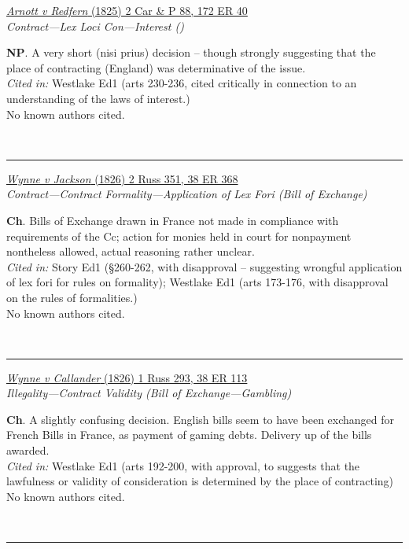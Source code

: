 \documentclass[twoside]{article}
\begin{document}
        \begin{small}
        \begin{center}
        \href{None}{\textit{Arnott v Redfern} (1825) 2 Car \& P 88, 172 ER 40} \label{35} \\ 
\textit{Contract---Lex Loci Con---Interest ()}\\
        \end{center}
        \textbf{NP}. A very short (nisi prius) decision – though strongly suggesting that the place of contracting (England) was determinative of the issue.\\\textit{Cited in: }Westlake Ed1 (arts 230-236, cited critically in connection to an understanding of the laws of interest.)\\No known authors cited.
        \end{small}\\
        \rule{\textwidth}{0.5pt}
        

        \begin{small}
        \begin{center}
        \href{https://heinonline.org/HOL/P?h=hein.engrep/engrc0038&i=376}{\textit{Wynne v Jackson} (1826) 2 Russ 351, 38 ER 368} \label{57} \\ 
\textit{Contract---Contract Formality---Application of Lex Fori (Bill of Exchange)}\\
        \end{center}
        \textbf{Ch}. Bills of Exchange drawn in France not made in compliance with requirements of the Cc; action for monies held in court for nonpayment nontheless allowed, actual reasoning rather unclear.\\\textit{Cited in: }Story Ed1 (§260-262, with disapproval – suggesting wrongful application of lex fori for rules on formality); Westlake Ed1 (arts 173-176, with disapproval on the rules of formalities.)\\No known authors cited.
        \end{small}\\
        \rule{\textwidth}{0.5pt}
        

        \begin{small}
        \begin{center}
        \href{https://heinonline.org/HOL/P?h=hein.engrep/engrc0038&i=121}{\textit{Wynne v Callander} (1826) 1 Russ 293, 38 ER 113} \label{67} \\ 
\textit{Illegality---Contract Validity (Bill of Exchange---Gambling)}\\
        \end{center}
        \textbf{Ch}. A slightly confusing decision. English bills seem to have been exchanged for French Bills in France, as payment of gaming debts. Delivery up of the bills awarded.\\\textit{Cited in: }Westlake Ed1 (arts 192-200, with approval, to suggests that the lawfulness or validity of consideration is determined by the place of contracting)\\No known authors cited.
        \end{small}\\
        \rule{\textwidth}{0.5pt}
        
\end{document}
